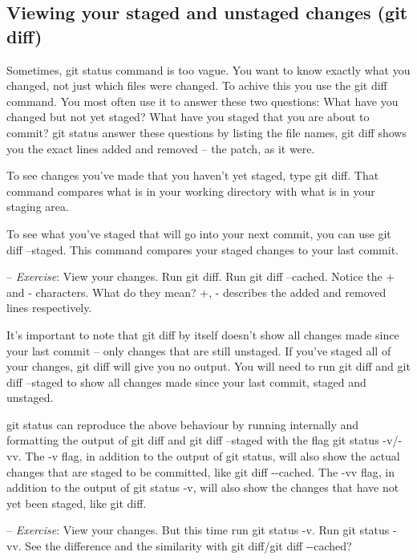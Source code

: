 \documentclass[12pt,a4]{article}
\newcommand{\ilcode}[1]{\textcolor[RGB]{160, 110, 220}{#1}}
\begin{document}
\subsection{Viewing your staged and unstaged changes (git diff)}
Sometimes, \ilcode{git status} command is too vague. You want to know exactly
what you changed, not just which files were changed. To achive this you use the
\ilcode{git diff} command. You most often use it to answer these two questions:
What have you changed but not yet staged? What have you staged that you are
about to commit? \ilcode{git status} answer these questions by listing the file
names, \ilcode{git diff} shows you the exact lines added and removed -- the
patch, as it were.

To see changes you've made that you haven't yet staged, type \ilcode{git diff}.
That command compares what is in your working directory with what is in your
staging area.

To see what you’ve staged that will go into your next commit, you can use
\ilcode{git diff --staged}. This command compares your staged changes to your
last commit.

{\sf -- \emph{Exercise}:} View your changes. Run \ilcode{git diff}. Run
\ilcode{git diff --cached}. Notice the + and - characters. What do they mean?
+, - describes the added and removed lines respectively.

It’s important to note that \ilcode{git diff} by itself doesn’t show all changes
made since your last commit -- only changes that are still unstaged. If you’ve
staged all of your changes, \ilcode{git diff} will give you no output. You will
need to run \ilcode{git diff} and \ilcode{git diff --staged} to show all changes
made since your last commit, staged and unstaged.

\ilcode{git status} can reproduce the above behaviour by running internally and
formatting the output of \ilcode{git diff} and \ilcode{git diff --staged} with
the flag \ilcode{git status -v}/\ilcode{-vv}. The \ilcode{-v} flag, in addition
to the output of \ilcode{git status}, will also show the actual changes that are
staged to be committed, like \ilcode{git diff -{}-cached}. The \ilcode{-vv}
flag, in addition to the output of \ilcode{git status -v}, will also show the
changes that have not yet been staged, like \ilcode{git diff}.

{\sf -- \emph{Exercise}:} View your changes. But this time run \ilcode{git
status -v}. Run \ilcode{git status -vv}. See the difference and the similarity
with \ilcode{git diff}/\ilcode{git diff -{}-cached}?
\end{document}
